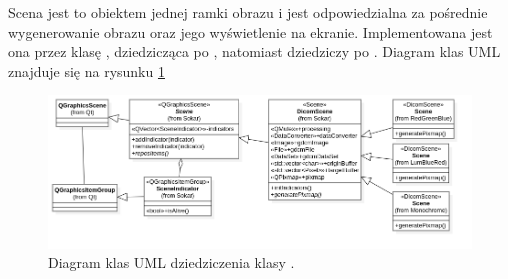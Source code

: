 \label{sec:sokar-dicomscene}

Scena jest to obiektem jednej ramki obrazu i jest odpowiedzialna za pośrednie wygenerowanie obrazu oraz jego wyświetlenie na ekranie.
Implementowana jest ona przez klasę , dziedzicząca po , natomiast  dziedziczy po .
Diagram klas UML znajduje się na rysunku \ref{uml:sokar-dicomscene}

\begin{figure}[!htbp]
    \centering
    \includegraphics[width=\textwidth]{img/uml/dicom-scene.png}
    \caption{Diagram klas UML dziedziczenia klasy .}
    \label{uml:sokar-dicomscene}
\end{figure}

